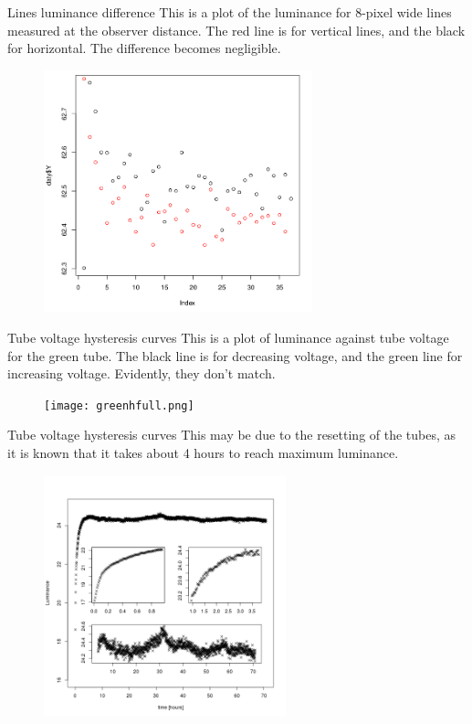 \documentclass{beamer}
\begin{document}
\begin{frame}[t]{Lines luminance difference}
This is a plot of the luminance for 8-pixel wide lines measured at the observer distance. The red line is for vertical lines, and the black for horizontal. The difference becomes negligible.
\begin{figure}[c]
\includegraphics[height=7cm]{line8dist.png}
\end{figure}
\end{frame}

\begin{frame}[t]{Tube voltage hysteresis curves}
This is a plot of luminance against tube voltage for the green tube. The black line is for decreasing voltage, and the green line for increasing voltage. Evidently, they don't match.
\begin{figure}[c]
\texttt{[image: greenhfull.png]}
\end{figure}
\end{frame}

\begin{frame}[t]{Tube voltage hysteresis curves}
This may be due to the resetting of the tubes, as it is known that it takes about 4 hours to reach maximum luminance.
\begin{figure}[c]
\includegraphics[height=7cm]{timetubes.png}
\end{figure}
\end{frame}
\end{document}
